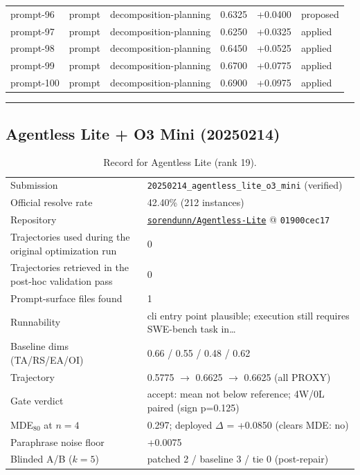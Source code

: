 \begin{center}
\begin{longtable}{llp{5.2cm}rrl}
prompt-96 & prompt & decomposition-planning & 0.6325 & +0.0400 & proposed \\
prompt-97 & prompt & decomposition-planning & 0.6250 & +0.0325 & applied \\
prompt-98 & prompt & decomposition-planning & 0.6450 & +0.0525 & applied \\
prompt-99 & prompt & decomposition-planning & 0.6700 & +0.0775 & applied \\
prompt-100 & prompt & decomposition-planning & 0.6900 & +0.0975 & applied \\
\bottomrule\end{longtable}\end{center}
\par\bigskip\hrule\bigskip
\subsection{Agentless Lite + O3 Mini (20250214)}
\label{app:agent19}
\begin{table}[H]\centering\scriptsize
\caption{Record for Agentless Lite (rank 19).}
\begin{tabular}{lp{8.2cm}}\toprule
Submission & \texttt{20250214\_\allowbreak{}agentless\_\allowbreak{}lite\_\allowbreak{}o3\_\allowbreak{}mini} (verified) \\
Official resolve rate & 42.40\% (212 instances) \\
Repository & \href{https://github.com/sorendunn/Agentless-Lite}{\texttt{sorendunn/Agentless-Lite}} @ \texttt{01900cec17} \\
Trajectories used during the original optimization run & 0 \\
Trajectories retrieved in the post-hoc validation pass & 0 \\
Prompt-surface files found & 1 \\
Runnability & cli entry point plausible; execution still requires SWE-bench task in\ldots{} \\
Baseline dims (TA/RS/EA/OI) & 0.66 / 0.55 / 0.48 / 0.62 \\
Trajectory & 0.5775 $\to$ 0.6625 $\to$ 0.6625 (all PROXY) \\
Gate verdict & accept: mean not below reference; 4W/0L paired (sign p=0.125) \\
MDE$_{80}$ at $n{=}4$ & 0.297; deployed $\Delta$ = +0.0850 (clears MDE: no) \\
Paraphrase noise floor & +0.0075 \\
Blinded A/B ($k{=}5$) & patched 2 / baseline 3 / tie 0 (post-repair) \\
\bottomrule\end{tabular}\end{table}
